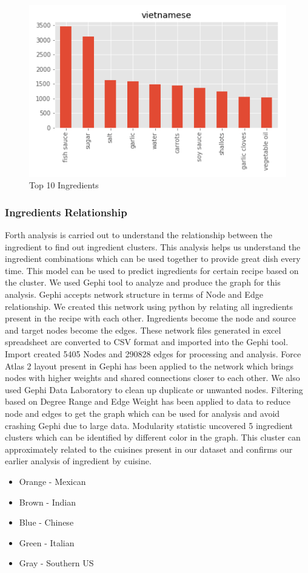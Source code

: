 \documentclass[sigconf]{acmart}
\begin{document}
\begin{figure}[!ht]
  \centering\includegraphics[width=\columnwidth]{images/vietnamese_10_most_used_ingredients.png}
  \caption{Top 10 Ingredients }\label{f:vietnamese_10_most_used_ingredients}
\end{figure}


\subsubsection{Ingredients Relationship}
Forth analysis is carried out to understand the relationship between the ingredient to find out ingredient clusters. This analysis helps us understand the ingredient combinations which can be used together to provide great dish every time. This model can be used to predict ingredients for certain recipe based on the cluster. We used Gephi tool to analyze and produce the graph for this analysis. Gephi accepts network structure in terms of Node and Edge relationship. We created this network using python by relating all ingredients present in the recipe with each other. Ingredients become the node and source and target nodes become the edges. These network files generated in excel spreadsheet are converted to CSV format and imported into the Gephi tool. Import created 5405 Nodes and 290828 edges for processing and analysis. Force Atlas 2 layout present in Gephi has been applied to the network which brings nodes with higher weights and shared connections closer to each other. We also used Gephi Data Laboratory to clean up duplicate or unwanted nodes. Filtering based on Degree Range and Edge Weight has been applied to data to reduce node and edges to get the graph which can be used for analysis and avoid crashing Gephi due to large data. Modularity statistic uncovered 5 ingredient clusters which can be identified by different color in the graph. This cluster can approximately related to the cuisines present in our dataset and confirms our earlier analysis of ingredient by cuisine.
\begin{itemize}
\item Orange - Mexican
\item Brown  - Indian
\item Blue   - Chinese
\item Green  - Italian
\item Gray   - Southern US
\end{itemize}
\end{document}

